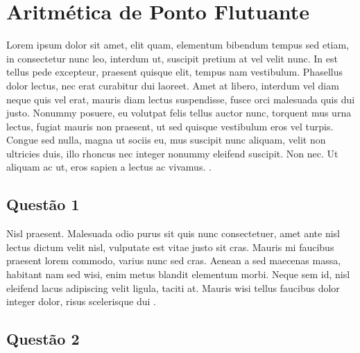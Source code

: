 
\chapter{Aritmética de Ponto Flutuante}\label{partes:floatPointArit}

  Lorem ipsum dolor sit amet, elit quam, elementum bibendum tempus sed etiam, in consectetur nunc leo, interdum ut, suscipit pretium at vel velit nunc. In est tellus pede excepteur, praesent quisque elit, tempus nam vestibulum. Phasellus dolor lectus, nec erat curabitur dui laoreet. Amet at libero, interdum vel diam neque quis vel erat, mauris diam lectus suspendisse, fusce orci malesuada quis dui justo. Nonummy posuere, eu volutpat felis tellus auctor nunc, torquent mus urna lectus, fugiat mauris non praesent, ut sed quisque vestibulum eros vel turpis. Congue sed nulla, magna ut sociis eu, mus suscipit nunc aliquam, velit non ultricies duis, illo rhoncus nec integer nonummy eleifend suscipit. Non nec. Ut aliquam ac ut, eros sapien a lectus ac vivamus. \citet{einstein}.

  \section{Questão 1}
  \label{sec:question1}

    Nisl praesent. Malesuada odio purus sit quis nunc consectetuer, amet ante nisl lectus dictum velit nisl, vulputate est vitae justo sit cras. Mauris mi faucibus praesent lorem commodo, varius nunc sed cras. Aenean a sed maecenas massa, habitant nam sed wisi, enim metus blandit elementum morbi. Neque sem id, nisl eleifend lacus adipiscing velit ligula, taciti at. Mauris wisi tellus faucibus dolor integer dolor, risus scelerisque dui \citet*{latexcompanion}.

  \section{Questão 2}
  \label{sec:question2}

